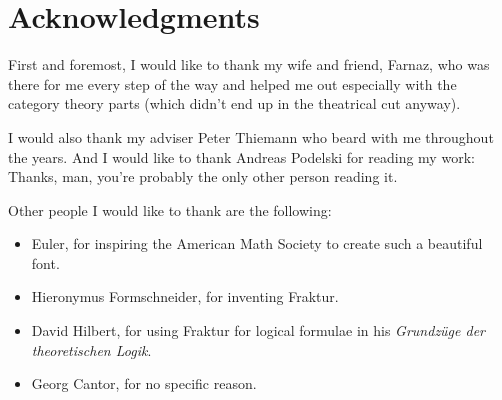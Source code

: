 \chapter{Acknowledgments}

First and foremost, I would like to thank my wife and friend, Farnaz, who was there for me every step of the way and helped me out especially with the category theory parts (which didn't end up in the theatrical cut anyway).

I would also thank my adviser Peter Thiemann who beard with me throughout the years. And I would like to thank Andreas Podelski for reading my work: Thanks, man, you're probably the only other person reading it.

Other people I would like to thank are the following:
\begin{itemize}
    \item Euler, for inspiring the American Math Society to create such a beautiful font.
    \item Hieronymus Formschneider, for inventing Fraktur.
    \item David Hilbert, for using Fraktur for logical formulae in his \textit{Grundzüge der theoretischen Logik}.
    \item Georg Cantor, for no specific reason.
\end{itemize}